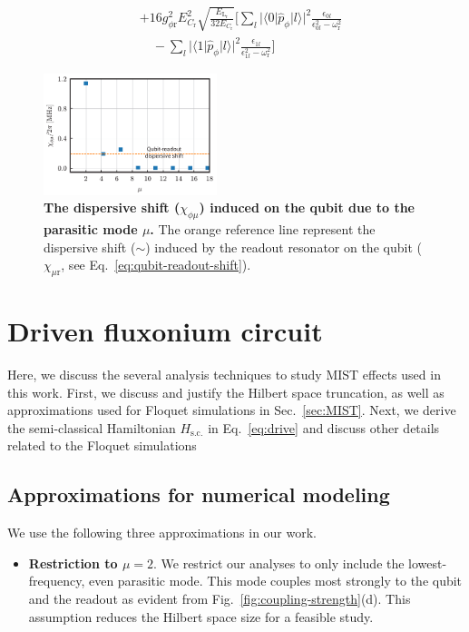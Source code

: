 \documentclass[%
reprint,
superscriptaddress,
 amsmath,amssymb,
 aps,
 prx,
longbibliography,
floatfix,
]{revtex4-2}
\begin{document}
{\begin{align}
   &+16g_{\phi\textrm{r}}^2E_{C_\textrm{r}}^2\sqrt{\frac{E_{\textrm{L}_\textrm{r}}}{32E_{C_\textrm{r}}}}\Bigg[\sum_l|\langle 0|\hat p_\phi|l \rangle|^2\frac{\epsilon_{0l}}{\epsilon_{0l}^2-\omega_\textrm{r}^2}\nonumber\\&\quad-\sum_l|\langle 1|\hat p_\phi|l \rangle|^2\frac{\epsilon_{1l}}{\epsilon_{1l}^2-\omega_\textrm{r}^2}\Bigg]\label{eq:qubit-readout-shift}
\end{align}
\begin{figure}[t]
    \centering
    \includegraphics[width=0.45\textwidth]{Supp_Fig/dispersive_shift.pdf}
    \caption{ {\bf The dispersive shift ($\chi_{\phi\mu}$) induced on the qubit due to the parasitic mode $\mu$.} The orange reference line represent the dispersive shift ($\sim $) induced by the readout resonator on the qubit ($\chi_{\mu\textrm{r}}$, see Eq.~\ref{eq:qubit-readout-shift}).}
    \label{fig:dispersive-shift}
\end{figure}

\section{Driven fluxonium circuit}\label{app:MIST}
Here, we discuss the several analysis techniques to study MIST effects used in this work. First, we discuss and justify the Hilbert space truncation, as well as approximations used for Floquet simulations in Sec.~\ref{sec:MIST}. Next, we derive the semi-classical Hamiltonian $H_\textrm{s.c.}$ in Eq.~\ref{eq:drive} and discuss other details related to the Floquet simulations
\subsection{Approximations for numerical modeling}\label{app:numerics}
We use the following three approximations in our work.
\begin{itemize}
    \item \textbf{Restriction to $\mu=2$}. We restrict our analyses to only include the lowest-frequency, even parasitic mode. This mode couples most strongly to the qubit and the readout as evident from Fig.~\ref{fig:coupling-strength}(d). This assumption reduces the Hilbert space size for a feasible study. 


\end{itemize}}
\end{document}
